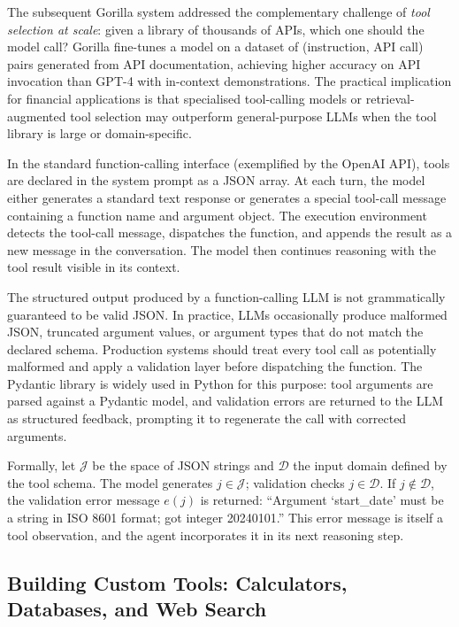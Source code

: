 \begin{deepdive}
The subsequent Gorilla system \cite{patil2023gorilla} addressed the complementary
challenge of \emph{tool selection at scale}: given a library of thousands of APIs,
which one should the model call? Gorilla fine-tunes a model on a dataset of (instruction,
API call) pairs generated from API documentation, achieving higher accuracy on API
invocation than GPT-4 with in-context demonstrations. The practical implication for
financial applications is that specialised tool-calling models or retrieval-augmented
tool selection may outperform general-purpose LLMs when the tool library is large or
domain-specific.

In the standard function-calling interface (exemplified by the OpenAI API), tools are
declared in the system prompt as a JSON array. At each turn, the model either generates
a standard text response or generates a special tool-call message containing a function
name and argument object. The execution environment detects the tool-call message,
dispatches the function, and appends the result as a new message in the conversation.
The model then continues reasoning with the tool result visible in its context.

The structured output produced by a function-calling LLM is not grammatically guaranteed
to be valid JSON. In practice, LLMs occasionally produce malformed JSON, truncated
argument values, or argument types that do not match the declared schema. Production
systems should treat every tool call as potentially malformed and apply a validation
layer before dispatching the function. The Pydantic library is widely used in Python
for this purpose: tool arguments are parsed against a Pydantic model, and validation
errors are returned to the LLM as structured feedback, prompting it to regenerate the
call with corrected arguments.

Formally, let $\mathcal{J}$ be the space of JSON strings and $\mathcal{D}$ the input
domain defined by the tool schema. The model generates $j \in \mathcal{J}$; validation
checks $j \in \mathcal{D}$. If $j \notin \mathcal{D}$, the validation error message
$e(j)$ is returned: ``Argument `start\_date' must be a string in ISO 8601 format; got
integer 20240101.'' This error message is itself a tool observation, and the agent
incorporates it in its next reasoning step.


\subsection{Building Custom Tools: Calculators, Databases, and Web Search}
\label{subsec:custom-tools}


\end{deepdive}
